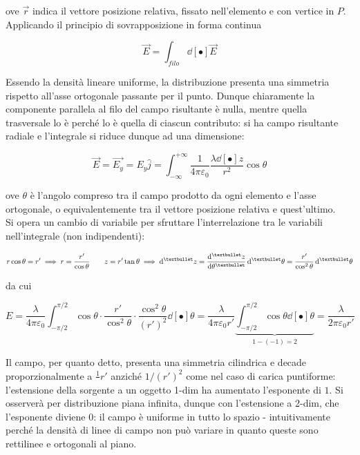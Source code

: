 ove $\vec{r}$ indica il vettore posizione relativa, fissato nell'elemento e con vertice in $P$. Applicando il principio di sovrapposizione in forma continua

\[\vec{E} = \int_{filo} \dd[•]{\vec{E}}\]

Essendo la densità lineare uniforme, la distribuzione presenta una simmetria rispetto all'asse ortogonale passante per il punto. Dunque chiaramente la componente parallela al filo del campo risultante è nulla, mentre quella trasversale lo è perché lo è quella di ciascun contributo: si ha campo risultante radiale e l'integrale si riduce dunque ad una dimensione:

\[\vec{E} = \vec{E_y} = E_y \hat{j} = \int_{-\infty}^{+\infty} \frac{1}{4 \pi \varepsilon_0} \frac{\lambda \dd[•]{z}}{r^2} \cos \theta\]

ove $\theta$ è l'angolo compreso tra il campo prodotto da ogni elemento e l'asse ortogonale, o equivalentemente tra il vettore posizione relativa e quest'ultimo. 
\\Si opera un cambio di variabile per sfruttare l'interrelazione tra le variabili nell'integrale (non indipendenti):

\[r \cos \theta = r' \implies r = \frac{r'}{\cos \theta} \qquad z = r' \tan \theta \implies \dd[•]{z} = \dv[•]{z}{\theta} \dd[•]{\theta} = \frac{r'}{\cos^2 \theta} \dd[•]{\theta}\]

da cui

\[E = \frac{\lambda}{4 \pi \varepsilon_0} \int_{-\pi/2}^{\pi/2} \cos \theta \cdot \frac{r'}{\cos^2 \theta} \cdot \frac{\cos^2 \theta}{(r')^2} \dd[•]{\theta} = \frac{\lambda}{4 \pi \varepsilon_0 r'} \underbrace{\int_{-\pi/2}^{\pi/2} \cos \theta \dd[•]{\theta}}_{1 - (-1) = 2} = \frac{\lambda}{2 \pi \varepsilon_0 r'}\]

Il campo, per quanto detto, presenta una simmetria cilindrica e decade proporzionalmente a $\frac{1}{}{r'}$ anziché $1/(r')^2$ come nel caso di carica puntiforme: l'estensione della sorgente a un oggetto 1-dim ha aumentato l'esponente di $1$. Si osserverà per distribuzione piana infinita, dunque con l'estensione a 2-dim, che l'esponente diviene $0$: il campo è uniforme in tutto lo spazio - intuitivamente perché la densità di linee di campo non può variare in quanto queste sono rettilinee e ortogonali al piano.

